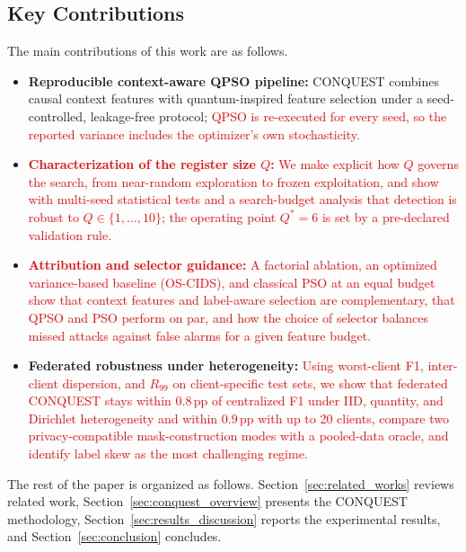 \documentclass[conference]{IEEEtran}
\begin{document}
\subsection{Key Contributions}
The main contributions of this work are as follows.
\begin{itemize}
    \item \textbf{Reproducible context-aware QPSO pipeline:} CONQUEST
    combines causal context features with quantum-inspired feature
    selection under a seed-controlled, leakage-free protocol;
    \textcolor{red}{QPSO is re-executed for every seed, so the reported
    variance includes the optimizer's own stochasticity.}

    \item \textbf{\textcolor{red}{Characterization of the
    register size $Q$:}} \textcolor{red}{We make explicit how $Q$ governs
    the search, from near-random exploration to frozen exploitation,
    and show with multi-seed statistical tests and a search-budget
    analysis that detection is robust to $Q\in\{1,\dots,10\}$; the
    operating point $Q^{*}=6$ is set by a pre-declared validation rule.}

    \item \textbf{\textcolor{red}{Attribution and selector guidance:}}
    \textcolor{red}{A factorial ablation, an optimized variance-based
    baseline (OS-CIDS), and classical PSO at an equal budget show that
    context features and label-aware selection are complementary, that
    QPSO and PSO perform on par, and how the choice of selector balances
    missed attacks against false alarms for a given feature budget.}

    \item \textbf{Federated robustness under heterogeneity:}
    \textcolor{red}{Using worst-client F1,
    inter-client dispersion, and $R_{99}$ on client-specific test sets,
    we show that federated CONQUEST stays within 0.8\,pp of centralized
    F1 under IID, quantity, and Dirichlet heterogeneity and within
    0.9\,pp with up to 20 clients, compare two privacy-compatible
    mask-construction modes with a pooled-data oracle, and identify
    label skew as the most
    challenging regime.}
\end{itemize}

The rest of the paper is organized as follows.
Section~\ref{sec:related_works} reviews related work,
Section~\ref{sec:conquest_overview} presents the CONQUEST methodology,
Section~\ref{sec:results_discussion} reports the experimental results,
and Section~\ref{sec:conclusion} concludes.
\end{document}
